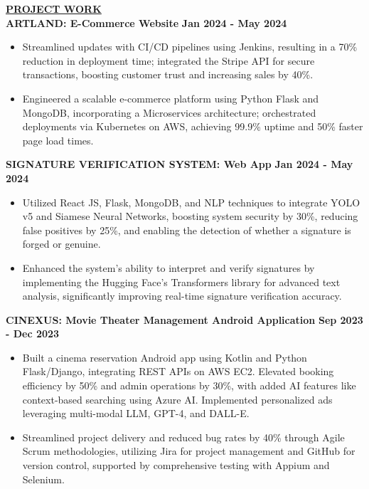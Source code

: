 \documentclass{article}
\begin{document}
\noindent \textbf{\underline{PROJECT WORK}} \\
\noindent \textbf{ARTLAND: E-Commerce Website} \textit \hfill \textbf{Jan 2024 - May 2024} 
\begin{itemize}[noitemsep,nolistsep,leftmargin=*]
\item {\small Streamlined updates with CI/CD pipelines using Jenkins, resulting in a 70\% reduction in deployment time; integrated the Stripe API for secure transactions, boosting customer trust and increasing sales by 40\%.}
\item {\small Engineered a scalable e-commerce platform using Python Flask and MongoDB, incorporating a Microservices architecture; orchestrated deployments via Kubernetes on AWS, achieving 99.9\% uptime and 50\% faster page load times.}
\end{itemize}
\begin{itemize}
\end{itemize}
\noindent \textbf{SIGNATURE VERIFICATION SYSTEM: Web App  } \textit \hfill \textbf{Jan 2024 - May 2024} 
\begin{itemize}[noitemsep,nolistsep,leftmargin=*]
\item {\small Utilized React JS, Flask, MongoDB, and NLP techniques to integrate YOLO v5 and Siamese Neural Networks, boosting system security by 30\%,  reducing false positives by 25\%, and enabling the detection of whether a signature is forged or genuine.}
\item {\small Enhanced the system's ability to interpret and verify signatures by implementing the Hugging Face's Transformers library for advanced text analysis, significantly improving real-time signature verification accuracy.}
\end{itemize}
\begin{itemize}
\end{itemize}
\noindent \textbf{CINEXUS: Movie Theater Management Android Application} \textit \hfill \textbf{Sep 2023 - Dec 2023}
\begin{itemize}[noitemsep,nolistsep,leftmargin=*]
\item {\small Built a cinema reservation Android app using Kotlin and Python Flask/Django, integrating REST APIs on AWS EC2. Elevated booking efficiency by 50\% and admin operations by 30\%, with added AI features like context-based searching using Azure AI. Implemented personalized ads leveraging multi-modal LLM, GPT-4, and DALL-E.}
\item {\small Streamlined project delivery and reduced bug rates by 40\% through Agile Scrum methodologies, utilizing Jira for project management and GitHub for version control, supported by comprehensive testing with Appium and Selenium.}
\end{itemize}
\end{document}

